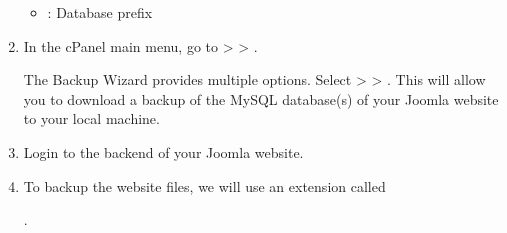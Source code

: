\documentclass[a4paper,10pt,english,openany,oneside]{sphinxmanual}
\begin{document}
\begin{sloppypar}
\begin{enumerate}
\begin{itemize}
\item {} 
\sphinxAtStartPar
{}: Database prefix
\begin{quote}

\begin{figure}[H]
\centering

\noindent{}
\end{figure}
\end{quote}

\end{itemize}

\item {} 
\sphinxAtStartPar
In the cPanel main menu, go to  >  > .
\begin{quote}

\begin{figure}[H]
\centering

\noindent{}
\end{figure}
\end{quote}

\sphinxAtStartPar
The Backup Wizard provides multiple options. Select  >  > . This will allow you to download a backup of the MySQL database(s) of your Joomla website to your local machine.
\begin{quote}

\begin{figure}[H]
\centering

\noindent{}
\end{figure}
\end{quote}

\item {} 
\sphinxAtStartPar
Login to the backend of your Joomla website.
\begin{quote}

\begin{figure}[H]
\centering

\noindent{}
\end{figure}
\end{quote}

\item {} 
\sphinxAtStartPar
To backup the website files, we will use an extension called %
\begin{footnote}[7]\sphinxAtStartFootnote
{}
%
\end{footnote}.
\begin{quote}


\end{quote}
\end{enumerate}
\end{sloppypar}
\end{document}
